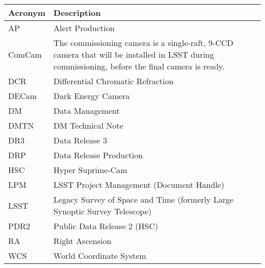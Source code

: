 \addtocounter{table}{-1}
\begin{longtable}{p{}p{}}\hline
\textbf{Acronym} & \textbf{Description}  \\\hline

AP & Alert Production \\\hline
ComCam & The commissioning camera is a single-raft, 9-CCD camera that will be installed in LSST during commissioning, before the final camera is ready. \\\hline
DCR & Differential Chromatic Refraction \\\hline
DECam & Dark Energy Camera \\\hline
DM & Data Management \\\hline
DMTN & DM Technical Note \\\hline
DR3 & Data Release 3 \\\hline
DRP & Data Release Production \\\hline
HSC & Hyper Suprime-Cam \\\hline
LPM & LSST Project Management (Document Handle) \\\hline
LSST & Legacy Survey of Space and Time (formerly Large Synoptic Survey Telescope) \\\hline
PDR2 & Public Data Release 2 (HSC) \\\hline
RA & Right Ascension \\\hline
WCS & World Coordinate System \\\hline
\end{longtable}
